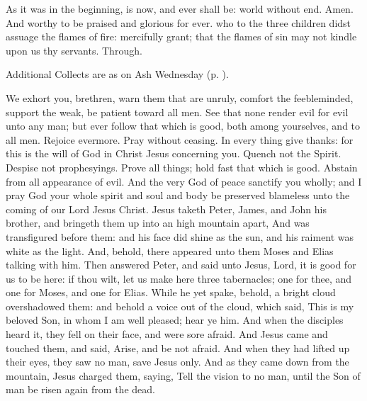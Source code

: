 As it was in the beginning, is now, and ever shall be: world without end. Amen. And worthy to be praised and glorious for ever.
{} who to the three children didst assuage the flames of fire: mercifully grant; that the flames of sin may not kindle upon us thy servants. Through.
\begin{rubric}
    Additional Collects are as on Ash Wednesday (p. \pageref{AshWednesdayMassCollect}).
\end{rubric}
 We exhort you, brethren, warn them that are unruly, comfort the feebleminded, support the weak, be patient toward all men. See that none render evil for evil unto any man; but ever follow that which is good, both among yourselves, and to all men. Rejoice evermore. Pray without ceasing. In every thing give thanks: for this is the will of God in Christ Jesus concerning you. Quench not the Spirit. Despise not prophesyings. Prove all things; hold fast that which is good. Abstain from all appearance of evil. And the very God of peace sanctify you wholly; and I pray God your whole spirit and soul and body be preserved blameless unto the coming of our Lord Jesus Christ.
 Jesus taketh Peter, James, and John his brother, and bringeth them up into an high mountain apart, And was transfigured before them: and his face did shine as the sun, and his raiment was white as the light. And, behold, there appeared unto them Moses and Elias talking with him. Then answered Peter, and said unto Jesus, Lord, it is good for us to be here: if thou wilt, let us make here three tabernacles; one for thee, and one for Moses, and one for Elias. While he yet spake, behold, a bright cloud overshadowed them: and behold a voice out of the cloud, which said, This is my beloved Son, in whom I am well pleased; hear ye him. And when the disciples heard it, they fell on their face, and were sore afraid. And Jesus came and touched them, and said, Arise, and be not afraid. And when they had lifted up their eyes, they saw no man, save Jesus only. And as they came down from the mountain, Jesus charged them, saying, Tell the vision to no man, until the Son of man be risen again from the dead.

